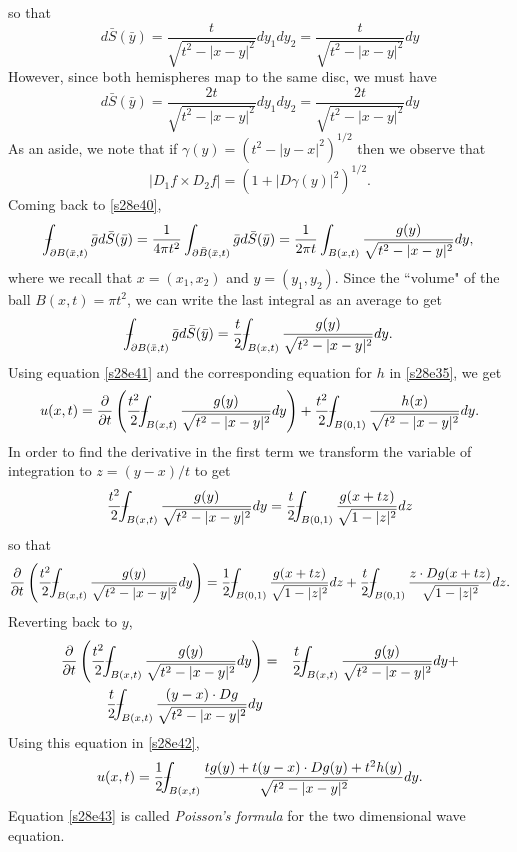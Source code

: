 \documentclass{article}
\newcommand{\fint}{\mbox{--}\mkern-16mu\int}
\theoremstyle{plain}
\numberwithin{thm}{section}
\theoremstyle{plain}
\numberwithin{prop}{section}
\theoremstyle{definition}
\numberwithin{defn}{section}
\theoremstyle{remark}
\numberwithin{equation}{section}
\begin{document}
so that
\[
d\bar{S}(\bar{y}) = \frac{t}{\sqrt{t^2 - |x - y|^2}}dy_1dy_2 = \frac{t}{\sqrt{t^2 - |x - y|^2}}dy
\]
However, since both hemispheres map to the same disc, we must have
\begin{equation}\label{s28e40}
d\bar{S}(\bar{y}) = \frac{2t}{\sqrt{t^2 - |x - y|^2}}dy_1dy_2 = \frac{2t}{\sqrt{t^2 - |x - y|^2}}dy
\end{equation}
As an aside, we note that if $\gamma(y) = (t^2 - |y - x|^2)^{1/2}$ then we observe that
\[
|D_1f \times D_2f| = (1 + |D\gamma(y)|^2)^{1/2}.
\]
Coming back to \eqref{s28e40},
\[
\fint_{\partial B(\bar{x},t)}\bar{g}d\bar{S}(\bar{y}) = 
\frac{1}{4\pi t^2}\int_{\partial\bar{B}(\bar{x},t)}\bar{g}d\bar{S}(\bar{y}) = 
\frac{1}{2\pi t}\int_{B(x,t)}\frac{g(y)}{\sqrt{t^2 - |x - y|^2}}dy,
\]
where we recall that $x = (x_1, x_2)$ and $y = (y_1, y_2)$. Since the ``volume" of the ball $B(x,t)=\pi t^2$, we
can write the last integral as an average to get
\begin{equation}\label{s28e41}
\fint_{\partial B(\bar{x},t)}\bar{g}d\bar{S}(\bar{y}) = \frac{t}{2}\fint_{B(x,t)} \frac{g(y)}{\sqrt{t^2 - 
|x - y|^2}}dy.
\end{equation}
Using equation \eqref{s28e41} and the corresponding equation for $h$ in \eqref{s28e35}, we get
\begin{equation}\label{s28e42}
u(x,t)=\frac{\partial}{\partial t}\left(\frac{t^2}{2}\fint_{B(x,t)} \frac{g(y)}{\sqrt{t^2 - |x - y|^2}}dy\right) + 
\frac{t^2}{2}\fint_{B(0,1)} \frac{h(x)}{\sqrt{t^2 - |x - y|^2}}dy.
\end{equation}
In order to find the derivative in the first term we transform the variable of integration to $z = (y - x)/t$ to
get
\[
\frac{t^2}{2}\fint_{B(x,t)} \frac{g(y)}{\sqrt{t^2 - |x - y|^2}}dy = 
\frac{t}{2}\fint_{B(0,1)} \frac{g(x+tz)}{\sqrt{1 - |z|^2}}dz
\]
so that
\[
\frac{\partial}{\partial t}\left(\frac{t^2}{2}\fint_{B(x,t)} \frac{g(y)}{\sqrt{t^2 - |x - y|^2}}dy\right) =
\frac{1}{2}\fint_{B(0,1)} \frac{g(x+tz)}{\sqrt{1 - |z|^2}}dz + 
\frac{t}{2}\fint_{B(0,1)} \frac{z\cdot Dg(x+tz)}{\sqrt{1 - |z|^2}}dz.
\]
Reverting back to $y$,
\begin{eqnarray*}
\frac{\partial}{\partial t}\left(\frac{t^2}{2}\fint_{B(x,t)} \frac{g(y)}{\sqrt{t^2 - |x - y|^2}}dy\right) &=&
\frac{t}{2}\fint_{B(x,t)}\frac{g(y)}{\sqrt{t^2 - |x - y|^2}}dy + \\
\frac{t}{2}\fint_{B(x,t)}\frac{(y-x)\cdot Dg}{\sqrt{t^2 - |x - y|^2}}dy
\end{eqnarray*}
Using this equation in \eqref{s28e42},
\begin{equation}\label{s28e43}
u(x,t) = \frac{1}{2}\fint_{B(x,t)}\frac{tg(y) + t(y-x)\cdot Dg(y) + t^2h(y)}{\sqrt{t^2 - |x - y|^2}}dy.
\end{equation}
Equation \eqref{s28e43} is called \emph{Poisson's formula} for the two dimensional wave equation.
\end{document}
